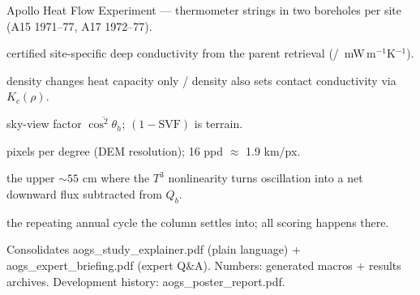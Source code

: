 \documentclass[11pt]{article}
\newcommand{\shead}[1]{\medskip\noindent{\color{teal}\large\bfseries #1}\par
  \nobreak\vspace{-2pt}{\color{teal}\rule{\linewidth}{0.6pt}}\par\smallskip}
\begin{document}
\shead{Glossary}
\begin{description}[leftmargin=0em, itemsep=1pt]\small
  \item[HFE] Apollo Heat Flow Experiment --- thermometer strings in two
    boreholes per site (A15 1971--77, A17 1972--77).
  \item[$K_d^{\star}$] certified site-specific deep conductivity from the parent
    retrieval (\kdstarAfif/\kdstarAsev\ mW\,m$^{-1}$K$^{-1}$).
  \item[cp / coupled branch] density changes heat capacity only / density also
    sets contact conductivity via $K_c(\rho)$.
  \item[SVF] sky-view factor $\overline{\cos^2\theta_h}$; $(1-\mathrm{SVF})$ is terrain.
  \item[ppd] pixels per degree (DEM resolution); 16 ppd $\approx$ 1.9 km/px.
  \item[rectification / $u_{\rm rect}$] the upper ${\sim}55$ cm where the $T^3$
    nonlinearity turns oscillation into a net downward flux subtracted from $Q_b$.
  \item[periodic equilibrium] the repeating annual cycle the column settles into;
    all scoring happens there.
\end{description}

\vspace{3pt}{\color{teal}\rule{\linewidth}{0.9pt}}
\begin{center}\footnotesize\color{dim}
Consolidates aogs\_study\_explainer.pdf (plain language) + aogs\_expert\_briefing.pdf
(expert Q\&A). Numbers: generated macros + results archives. Development history:
aogs\_poster\_report.pdf.
\end{center}
\end{document}
